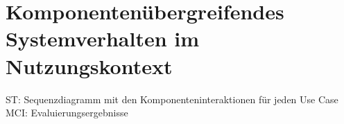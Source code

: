 \chapter{Komponentenübergreifendes Systemverhalten im Nutzungskontext}
ST: Sequenzdiagramm mit den Komponenteninteraktionen für jeden Use
Case
MCI: Evaluierungsergebnisse